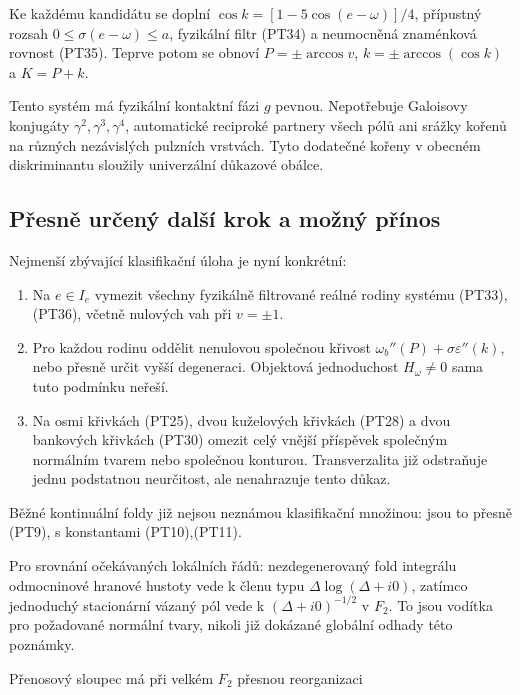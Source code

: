 \documentclass[11pt,a4paper]{article}
\theoremstyle{remark}\newtheorem{remark}[theorem]{Poznámka}
\numberwithin{equation}{section}
\begin{document}
Ke každému kandidátu se doplní
\(\cos k=[1-5\cos(e-\omega)]/4\), přípustný rozsah
\(0\le\sigma(e-\omega)\le a\), fyzikální filtr (PT34)
a neumocněná znaménková rovnost (PT35). Teprve potom se obnoví
\(P=\pm\arccos v\), \(k=\pm\arccos(\cos k)\) a \(K=P+k\).

Tento systém má fyzikální kontaktní fázi \(g\) pevnou. Nepotřebuje
Galoisovy konjugáty \(\gamma^2,\gamma^3,\gamma^4\), automatické
reciproké partnery všech pólů ani srážky kořenů na různých
nezávislých pulzních vrstvách. Tyto dodatečné kořeny v obecném
diskriminantu sloužily univerzální důkazové obálce.

\subsection{Přesně určený další krok a možný přínos}\label{pux159esnux11b-urux10denuxfd-dalux161uxed-krok-a-moux17enuxfd-pux159uxednos}

Nejmenší zbývající klasifikační úloha je nyní konkrétní:

\begin{enumerate}
\def\labelenumi{\arabic{enumi}.}
\item
  Na \(e\in I_e\) vymezit všechny fyzikálně filtrované reálné
  rodiny systému (PT33),(PT36), včetně nulových vah při
  \(v=\pm1\).
\item
  Pro každou rodinu oddělit nenulovou společnou křivost
  \(\omega_b''(P)+\sigma\varepsilon''(k)\), nebo přesně určit
  vyšší degeneraci. Objektová jednoduchost \(H_\omega\ne0\)
  sama tuto podmínku neřeší.
\item
  Na osmi křivkách (PT25), dvou kuželových křivkách (PT28) a
  dvou bankových křivkách (PT30) omezit celý vnější příspěvek
  společným normálním tvarem nebo společnou konturou.
  Transverzalita již odstraňuje jednu podstatnou neurčitost,
  ale nenahrazuje tento důkaz.
\end{enumerate}

Běžné kontinuální foldy již nejsou neznámou klasifikační množinou:
jsou to přesně (PT9), s konstantami (PT10),(PT11).

Pro srovnání očekávaných lokálních řádů: nezdegenerovaný fold
integrálu odmocninové hranové hustoty vede k členu typu
\(\Delta\log(\Delta+i0)\), zatímco jednoduchý stacionární
vázaný pól vede k \((\Delta+i0)^{-1/2}\) v \(F_2\).
To jsou vodítka pro požadované normální tvary, nikoli již
dokázané globální odhady této poznámky.

Přenosový sloupec má při velkém \(F_2\) přesnou reorganizaci
\end{document}
